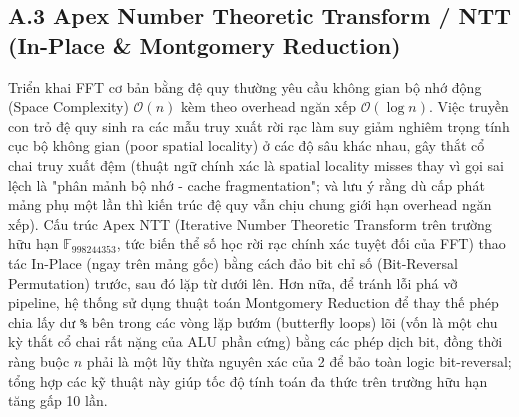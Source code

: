 \documentclass{article}
\begin{document}
\subsection*{A.3 Apex Number Theoretic Transform / NTT (In-Place \& Montgomery Reduction)}
Triển khai FFT cơ bản bằng đệ quy thường yêu cầu không gian bộ nhớ động (Space Complexity) $\mathcal{O}(n)$ kèm theo overhead ngăn xếp $\mathcal{O}(\log n)$. Việc truyền con trỏ đệ quy sinh ra các mẫu truy xuất rời rạc làm suy giảm nghiêm trọng tính cục bộ không gian (poor spatial locality) ở các độ sâu khác nhau, gây thắt cổ chai truy xuất đệm (thuật ngữ chính xác là spatial locality misses thay vì gọi sai lệch là "phân mảnh bộ nhớ - cache fragmentation"; và lưu ý rằng dù cấp phát mảng phụ một lần thì kiến trúc đệ quy vẫn chịu chung giới hạn overhead ngăn xếp). Cấu trúc Apex NTT (Iterative Number Theoretic Transform trên trường hữu hạn $\mathbb{F}_{998244353}$, tức biến thể số học rời rạc chính xác tuyệt đối của FFT) thao tác In-Place (ngay trên mảng gốc) bằng cách đảo bit chỉ số (Bit-Reversal Permutation) trước, sau đó lặp từ dưới lên. Hơn nữa, để tránh lỗi phá vỡ pipeline, hệ thống sử dụng thuật toán Montgomery Reduction để thay thế phép chia lấy dư \verb|%| bên trong các vòng lặp bướm (butterfly loops) lõi (vốn là một chu kỳ thắt cổ chai rất nặng của ALU phần cứng) bằng các phép dịch bit, đồng thời ràng buộc $n$ phải là một lũy thừa nguyên xác của 2 để bảo toàn logic bit-reversal; tổng hợp các kỹ thuật này giúp tốc độ tính toán đa thức trên trường hữu hạn tăng gấp 10 lần.



\newpage
\printindex
\printbibliography[heading=bibintoc, title={Tài Liệu Tham Khảo}]
\end{document}
